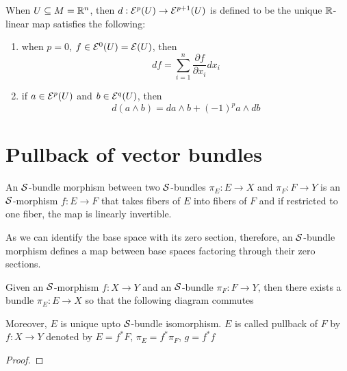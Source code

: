 \begin{definition}
	When $U \subseteq M = \mathbb{R}^n$, then $d: \mathcal{E}^p(U) \to \mathcal{E}^{p+1}(U)$ is defined to be the unique $\mathbb{R}$-linear map satisfies the following:
	\begin{enumerate}
		\item when $p=0$, $f \in \mathcal{E}^0(U) = \mathcal{E}(U)$, then
		$$
		df = \sum_{i=1}^n \frac{\partial f}{\partial x_i} dx_i
		$$
		
		\item if $a \in \mathcal{E}^p(U)$ and $b \in \mathcal{E}^q(U)$, then
		$$
		d(a \wedge b) = da \wedge b + (-1)^{p} a \wedge db
		$$
		
	\end{enumerate}
\end{definition}

\section{Pullback of vector bundles}

\begin{definition}
	An $\mathcal{S}$-bundle morphism between two $\mathcal{S}$-bundles $\pi_E: E \to X$ and $\pi_F: F \to Y$ is an $\mathcal{S}$-morphism $f: E \to F$ that takes fibers of $E$ into fibers of $F$ and if restricted to one fiber, the map is linearly invertible.
\end{definition}

\begin{remark}
	As we can identify the base space with its zero section, therefore, an $\mathcal{S}$-bundle morphism defines a map between base spaces factoring through their zero sections.
\end{remark}

\begin{proposition}[pullback]
	Given an $\mathcal{S}$-morphism $f: X \to Y$ and an $\mathcal{S}$-bundle $\pi_F: F \to Y$, then there exists a bundle $\pi_E: E \to X$ so that the following diagram commutes
	\begin{center}
		
		Moreover, $E$ is unique upto $\mathcal{S}$-bundle isomorphism. $E$ is called pullback of $F$ by $f: X \to Y$ denoted by $E = f^* F$, $\pi_E = f^* \pi_F$, $g = f^* f$
	\end{center}
	\begin{proof}
	\end{proof}
\end{proposition}

